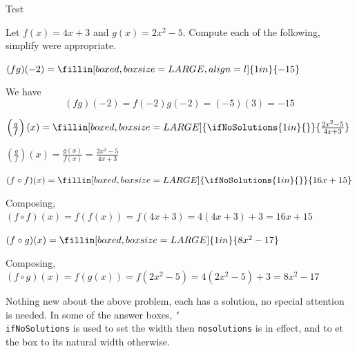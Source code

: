 \documentclass{article}
\newcommand{\cs}[1]{\texttt{\char`\\#1}}
\begin{document}
\begin{exam}{Test\nExam}
\begin{theseproblems}
\resetSolnAfterToDefault

\begin{problem*}[\auto]
Let $f(x) = 4x+3$ and $ g(x) = 2x^2 - 5 $. Compute each of the following,
simplify were appropriate.
\begin{multicols}{2}
\begin{parts}
\item {} $ (fg)(-2) = \fillin[boxed,boxsize=LARGE,align=l]{1in}{-15} $

\begin{solution}[.65in]
We have \[ (fg)(-2)=f(-2)g(-2)=(-5)(3)=\boxed{-15}\]
\end{solution}

\item {} $\left(\frac{g}{f}\right)(x)= \fillin[boxed,boxsize=LARGE]{\ifNoSolutions{1in}{}}{\frac{2x^2-5}{4x+3}} $

\begin{solution}[\sameVspace]
$ \left(\frac{g}{f}\right)(x)=\frac{g(x)}{f(x)}=\boxed{\frac{2x^2 - 5}{4x+3}}$
\end{solution}

\item {} $ (f\circ f )(x)  = \fillin[boxed,boxsize=LARGE]{\ifNoSolutions{1in}{}}{16x+15} $

\begin{solution}[\sameVspace]
Composing, $(f\circ f )(x)=f(f(x))=f(4x+3)=4(4x+3)+3=\boxed{16x+15}$
\end{solution}

\item {} $ (f\circ g )(x)  = \fillin[boxed,boxsize=LARGE]{1in}{8x^2-17} $

\begin{solution}[\sameVspace]
Composing, $(f\circ g )(x)=f(g(x))=f(2x^2 - 5)=4(2x^2 -5)+3=\boxed{8x^2-17}$
\end{solution}
\end{parts}
\end{multicols}
\end{problem*}

\begin{eqComments}[Comments:]
Nothing new about the above problem, each has a solution, no special
attention is needed. In some of the answer boxes, \cs{ifNoSolutions} is
used to set the width then \texttt{nosolutions} is in effect, and to et the box to
its natural width otherwise.
\end{eqComments}


\begingroup


\end{theseproblems}
\end{exam}
\end{document}
